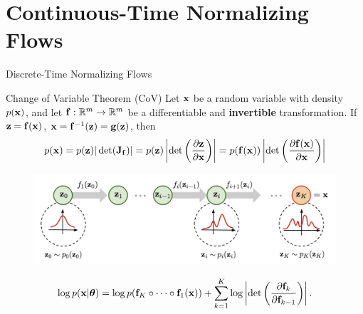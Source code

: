 \documentclass{beamer}
\begin{document}
\section{Continuous-Time Normalizing Flows}
\begin{frame}{Discrete-Time Normalizing Flows}
	\vspace{-0.3cm}
	\begin{block}{Change of Variable Theorem (CoV)}
		Let $\mathbf{x}$ be a random variable with density $p(\mathbf{x})$, and let $\mathbf{f}: \mathbb{R}^m \rightarrow \mathbb{R}^m$ be a differentiable and \textbf{invertible} transformation. If $\mathbf{z} = \mathbf{f}(\mathbf{x})$, $\mathbf{x} = \mathbf{f}^{-1}(\mathbf{z}) = \mathbf{g}(\mathbf{z})$, then
		\vspace{-0.3cm}
		\[
			p(\mathbf{x}) = p(\mathbf{z}) |\det(\mathbf{J}_{\mathbf{f}})| = p(\mathbf{z}) \left|\det \left( \frac{\partial \mathbf{z}}{\partial \mathbf{x}} \right) \right| = p(\mathbf{f}(\mathbf{x})) \left|\det \left(  \frac{\partial \mathbf{f}(\mathbf{x})}{\partial \mathbf{x}} \right) \right|
		\]
		\vspace{-0.5cm}
	\end{block}

	\vspace{-0.3cm}
	\begin{figure}
		\includegraphics[width=0.95\linewidth]{figs/normalizing-flow}
	\end{figure}
	\vspace{-0.4cm}
	\[
		\log p(\mathbf{x} | \boldsymbol{\theta}) = \log p(\mathbf{f}_K \circ \dots \circ \mathbf{f}_1(\mathbf{x})) + \sum_{k=1}^K\log \left|\det \left(\frac{\partial \mathbf{f}_k}{\partial \mathbf{f}_{k-1}}\right)\right|.
	\]
	\vspace{-0.4cm}
\end{frame}
\end{document}
